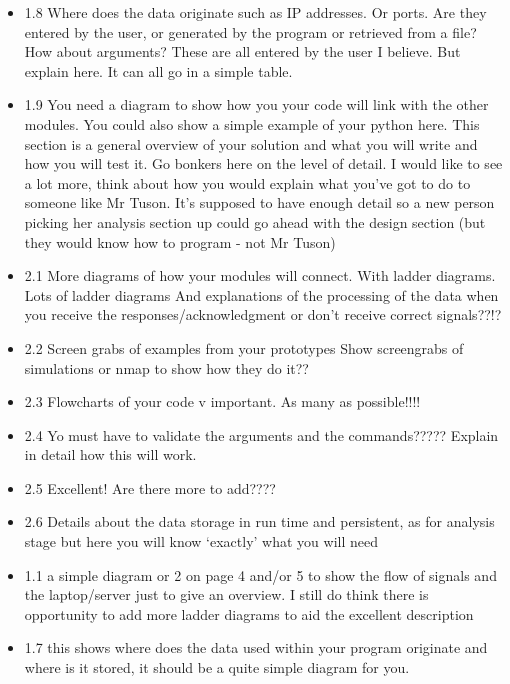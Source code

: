 \documentclass{article}
\begin{document}
\begin{itemize}
  \item{1.8 Where does the data originate such as IP addresses. Or ports. Are they entered by the user, or generated by the program or retrieved from a file? How about arguments? These are all entered by the user I believe. But explain here. It can all go in a simple table. }

  \item{1.9 You need a diagram to show how you your code will link with the other modules.  You could also show a simple example of your python here. This section is a general overview of your solution and what you will write and how you will test it. Go bonkers here on the level of detail. I would like to see a lot more, think about how you would explain what you’ve got to do to someone like Mr Tuson. It’s supposed to have enough detail so a new person picking her analysis section up could go ahead with the design section (but they would know how to program - not Mr Tuson)}

  \item{2.1 More diagrams of how your modules will connect. With ladder diagrams.  Lots of ladder diagrams And explanations of the processing of the data when you receive the responses/acknowledgment or don’t receive correct signals??!?}

  \item{2.2 Screen grabs of examples from your prototypes  Show screengrabs of simulations or nmap to show how they do it??}

  \item{2.3 Flowcharts of your code v important.  As many as possible!!!!}

  \item{2.4 Yo must have to validate the arguments and the commands????? Explain in detail how this will work. }

  \item{2.5 Excellent! Are there more to add????}

  \item{2.6 Details about the data storage in run time and persistent, as for analysis stage but here you will know ‘exactly’ what you will need }

  \item{1.1 a simple diagram or 2 on page 4 and/or 5 to show the flow of signals and the laptop/server just to give an overview.  I still do think there is opportunity to add more ladder diagrams to aid the excellent description}

  \item{1.7 this shows where does the data used within your program originate and where is it stored, it should be a quite simple diagram for you.}


\end{itemize}
\end{document}
